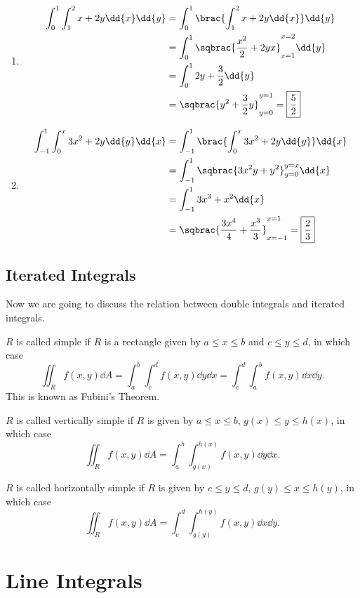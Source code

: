 \begin{solution}
\begin{enumerate}[label=(\alph*)]
\item 
\begin{align*}
\int_0^1\int_1^2x+2y\dd{x}\dd{y}
&= \int_0^1\brac{\int_1^2x+2y\dd{x}}\dd{y} \\
&= \int_0^1\sqbrac{\frac{x^2}{2}+2yx}_{x=1}^{x=2}\dd{y} \\
&= \int_0^12y+\frac{3}{2}\dd{y} \\
&= \sqbrac{y^2+\frac{3}{2}y}_{y=0}^{y=1}=\boxed{\frac{5}{2}}
\end{align*}

\item 
\begin{align*}
\int_{-1}^1\int_0^x3x^2+2y\dd{y}\dd{x}
&= \int_{-1}^1\brac{\int_0^x3x^2+2y\dd{y}}\dd{x} \\
&= \int_{-1}^1\sqbrac{3x^2y+y^2}_{y=0}^{y=x}\dd{x} \\
&= \int_{-1}^13x^3+x^2\dd{x} \\
&= \sqbrac{\frac{3x^4}{4}+\frac{x^3}{3}}_{x=-1}^{x=1}=\boxed{\frac{2}{3}}
\end{align*}
\end{enumerate}
\end{solution}

\section{Iterated Integrals}
Now we are going to discuss the relation between double integrals and iterated integrals.

$R$ is called simple if $R$ is a rectangle given by $a\le x\le b$ and $c\le y\le d$, in which case
\[ \iint_Rf(x,y)\dd{A}=\int_a^b\int_c^df(x,y)\dd{y}\dd{x}=\int_c^d\int_a^bf(x,y)\dd{x}\dd{y}. \]
This is known as Fubini's Theorem.

$R$ is called vertically simple if $R$ is given by $a\le x\le b$, $g(x)\le y\le h(x)$, in which case
\[ \iint_Rf(x,y)\dd{A}=\int_a^b\int_{g(x)}^{h(x)}f(x,y)\dd{y}\dd{x}. \]

$R$ is called horizontally simple if $R$ is given by $c\le y\le d$, $g(y)\le x\le h(y)$, in which case
\[ \iint_Rf(x,y)\dd{A}=\int_c^d\int_{g(y)}^{h(y)}f(x,y)\dd{x}\dd{y}. \]

\pagebreak

\chapter{Line Integrals}
